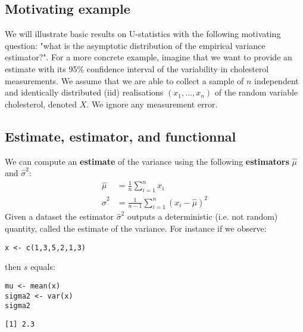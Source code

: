 \documentclass[12pt]{article}
\begin{document}
\subsection{Motivating example}
\label{sec:orgd7cc34a}

We will illustrate basic results on U-statistics with the following
motivating question: "what is the asymptotic distribution of the
empirical variance estimator?". For a more concrete example, imagine
that we want to provide an estimate with its 95\% confidence interval
of the variability in cholesterol measurements. We assume that we are
able to collect a sample of \(n\) independent and identically
distributed (iid) realisations \((x_1,\ldots,x_n)\) of the random
variable cholesterol, denoted \(X\). We ignore any measurement error.

\subsection{Estimate, estimator, and functionnal}
\label{sec:org8537d00}

We can compute an \textbf{estimate} of the variance using the following
\textbf{estimators} \(\hat{\mu}\) and \(\hat{\sigma}^2\):
\begin{align}
\hat{\mu} &= \frac{1}{n} \sum_{i=1}^n x_i \label{eq:m(F)} \\
\hat{\sigma}^2 &= \frac{1}{n-1} \sum_{i=1}^n (x_i-\hat{\mu})^2 \label{eq:s(F)}
\end{align}
Given a dataset the estimator \(\hat{\sigma}^2\) outputs a
deterministic (i.e. not random) quantity, called the estimate of the
variance. For instance if we observe:
\lstset{language=r,label= ,caption= ,captionpos=b,numbers=none}
\begin{lstlisting}
x <- c(1,3,5,2,1,3)
\end{lstlisting}

then \(s\) equals:
\lstset{language=r,label= ,caption= ,captionpos=b,numbers=none}
\begin{lstlisting}
mu <- mean(x)
sigma2 <- var(x)
sigma2
\end{lstlisting}

\begin{verbatim}
[1] 2.3
\end{verbatim}
\end{document}
